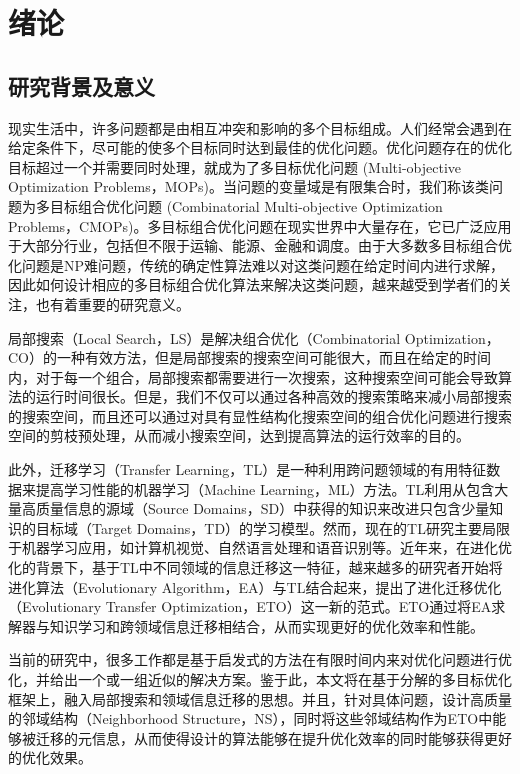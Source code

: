 \chapter{绪论}

\section{研究背景及意义}

现实生活中，许多问题都是由相互冲突和影响的多个目标组成。人们经常会遇到在给定条件下，尽可能的使多个目标同时达到最佳的优化问题。优化问题存在的优化目标超过一个并需要同时处理，就成为了多目标优化问题 (Multi-objective Optimization Problems，MOPs)。当问题的变量域是有限集合时，我们称该类问题为多目标组合优化问题 (Combinatorial Multi-objective Optimization Problems，CMOPs)。多目标组合优化问题在现实世界中大量存在，它已广泛应用于大部分行业，包括但不限于运输、能源、金融和调度。由于大多数多目标组合优化问题是NP难问题，传统的确定性算法难以对这类问题在给定时间内进行求解，因此如何设计相应的多目标组合优化算法来解决这类问题，越来越受到学者们的关注，也有着重要的研究意义。
\par
局部搜索（Local Search，LS）是解决组合优化（Combinatorial Optimization，CO）的一种有效方法，但是局部搜索的搜索空间可能很大，而且在给定的时间内，对于每一个组合，局部搜索都需要进行一次搜索，这种搜索空间可能会导致算法的运行时间很长。但是，我们不仅可以通过各种高效的搜索策略来减小局部搜索的搜索空间，而且还可以通过对具有显性结构化搜索空间的组合优化问题进行搜索空间的剪枝预处理，从而减小搜索空间，达到提高算法的运行效率的目的。
\par
此外，迁移学习（Transfer Learning，TL）是一种利用跨问题领域的有用特征数据来提高学习性能的机器学习（Machine Learning，ML）方法。TL利用从包含大量高质量信息的源域（Source Domains，SD）中获得的知识来改进只包含少量知识的目标域（Target Domains，TD）的学习模型\cite{pan2009survey}。然而，现在的TL研究主要局限于机器学习应用，如计算机视觉、自然语言处理和语音识别等。近年来，在进化优化的背景下，基于TL中不同领域的信息迁移这一特征，越来越多的研究者开始将进化算法（Evolutionary Algorithm，EA）与TL结合起来，提出了进化迁移优化（Evolutionary Transfer Optimization，ETO）这一新的范式。ETO通过将EA求解器与知识学习和跨领域信息迁移相结合，从而实现更好的优化效率和性能。
\par
当前的研究中，很多工作都是基于启发式的方法在有限时间内来对优化问题进行优化，并给出一个或一组近似的解决方案。鉴于此，本文将在基于分解的多目标优化框架上，融入局部搜索和领域信息迁移的思想。并且，针对具体问题，设计高质量的邻域结构（Neighborhood Structure，NS），同时将这些邻域结构作为ETO中能够被迁移的元信息，从而使得设计的算法能够在提升优化效率的同时能够获得更好的优化效果。

